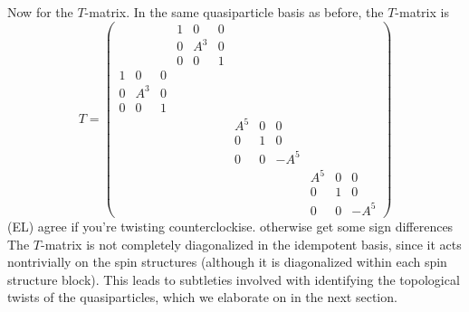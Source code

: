 \documentclass[12pt,a4paper]{article}
\newcommand\be            {\begin{equation}}
\newcommand\ee            {\end{equation}}
\newcommand{\ethan}[1]{{\color{amethyst}\footnotesize{(EL) #1}}}
\begin{document}
Now for the $T$-matrix. 
In the same quasiparticle basis as before, the $T$-matrix is
\be 
T = \begin{pmatrix}   			&&&				1&0&0&		&&&			&& \\ 
					        &&&				0&A^3&0&	&&&			&&\\
					        &&& 				0&0&1&		&&&			&&\\
						1&0&0&			&&&			&&&			&& \\
						0&A^3&0&		&&&			&&&			&&\\
						0&0&1&			&&&			&&&			&&\\
						&&&				&&&			A^{5}&0&0&	&&\\
						&&&				&&&			0&1&0&		&&\\
						&&&				&&&			0&0&-A^{5}&	&&\\
						&&&				&&&			&&&			A^{5}&0&0\\
						&&&				&&&			&&&			0&1&0 \\ 
						&&&				&&&			&&&			0&0&-A^{5} \end{pmatrix}\ee	
\ethan{agree if you're twisting counterclockise. otherwise get some sign differences}					
The $T$-matrix is not completely diagonalized in the idempotent basis, since it acts nontrivially on the spin structures (although it is diagonalized within each spin structure block). 
This leads to subtleties involved with identifying the topological twists of the quasiparticles, 
which we elaborate on in the next section. 
\end{document}
